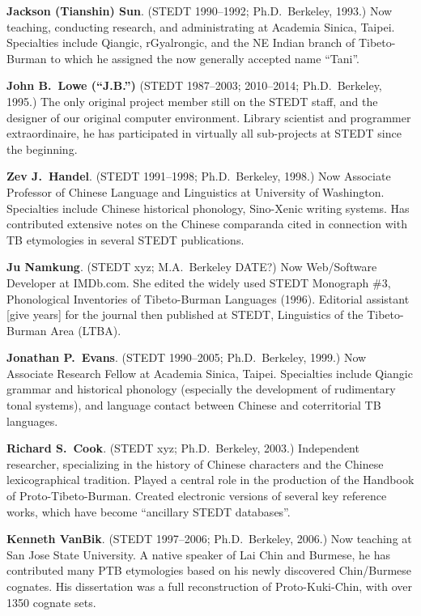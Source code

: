 \textbf{Jackson (Tianshin) Sun}. (STEDT 1990–1992; Ph.D.\ Berkeley, 1993.) Now teaching, conducting research, and administrating at Academia Sinica, Taipei. Specialties include Qiangic, rGyalrongic, and the NE Indian branch of Tibeto-Burman to which he assigned the now generally accepted name “Tani”.

\textbf{John B.\ Lowe (“J.B.”)} (STEDT 1987–2003; 2010–2014; Ph.D.\ Berkeley, 1995.) The only original project member still on the STEDT staff, and the designer of our original computer environment. Library scientist and programmer extraordinaire, he has participated in virtually all sub-projects at STEDT since the beginning.

\textbf{Zev J.\ Handel}. (STEDT 1991–1998; Ph.D.\ Berkeley, 1998.) Now Associate Professor of Chinese Language and Linguistics at University of Washington. Specialties include Chinese historical phonology, Sino-Xenic writing systems. Has contributed extensive notes on the Chinese comparanda cited in connection with TB etymologies in several STEDT publications.

\textbf{Ju Namkung}. (STEDT xyz; M.A.\ Berkeley DATE?) Now Web/Software Developer at IMDb.com. She edited the widely used STEDT Monograph \#3, Phonological Inventories of Tibeto-Burman Languages (1996). Editorial assistant [give years] for the journal then published at STEDT, Linguistics of the Tibeto-Burman Area (LTBA).

\textbf{Jonathan P.\ Evans}. (STEDT 1990–2005; Ph.D.\ Berkeley, 1999.) Now Associate Research Fellow at Academia Sinica, Taipei. Specialties include Qiangic grammar and historical phonology (especially the development of rudimentary tonal systems), and language contact between Chinese and coterritorial TB languages.

\textbf{Richard S.\ Cook}. (STEDT xyz; Ph.D.\ Berkeley, 2003.) Independent researcher, specializing in the history of Chinese characters and the Chinese lexicographical tradition. Played a central role in the production of the Handbook of Proto-Tibeto-Burman. Created electronic versions of several key reference works, which have become “ancillary STEDT databases”.

\textbf{Kenneth VanBik}. (STEDT 1997–2006; Ph.D.\ Berkeley, 2006.) Now teaching at San Jose State University. A native speaker of Lai Chin and Burmese, he has contributed many PTB etymologies based on his newly discovered Chin/Burmese cognates. His dissertation was a full reconstruction of Proto-Kuki-Chin, with over 1350 cognate sets.

